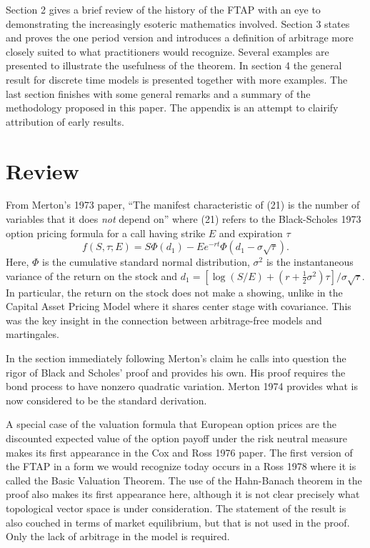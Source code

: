 \documentclass[fleqn]{amsart}
\newcommand{\onehalf}{\frac{1}{2}}
\begin{document}
Section 2 gives a brief review of the history of the FTAP with an
eye to demonstrating the increasingly esoteric mathematics involved.
Section 3 states and proves the one period version and introduces a
definition of arbitrage more closely suited to what practitioners would
recognize. Several examples are presented to illustrate the usefulness
of the theorem. In section 4 the general result for discrete time models
is presented together with more examples.  The last section finishes
with some general remarks and a summary of the methodology proposed
in this paper. The appendix is an attempt to clairify attribution of
early results.

\section{Review}
From Merton's 1973 \cite{Mer1973} paper,
``The manifest characteristic of (21) is the number of variables
that it does {\em not} depend on'' where (21)
refers to the Black-Scholes 1973 \cite{BlaSch1973} option pricing formula
for a call having strike $E$ and expiration $\tau$
\begin{equation*}
f(S, \tau; E) = S\Phi(d_1) - Ee^{-rt}\Phi(d_1 - \sigma\sqrt{\tau}).
\end{equation*}
Here, $\Phi$ is the cumulative standard normal distribution, $\sigma^2$ is the
instantaneous variance of the return on the stock and $d_1 = [\log(S/E)
+ (r + \onehalf\sigma^2)\tau]/\sigma\sqrt{\tau}$.
In particular, the return on the stock does
not make a showing, unlike in the Capital Asset Pricing Model
where it shares center stage with covariance.
This was the key insight in the connection between arbitrage-free
models and martingales.

In the section immediately following Merton's claim he calls into
question the rigor of Black and Scholes' proof and provides his own.
His proof requires the bond process to have nonzero quadratic variation.
Merton 1974 \cite{Mer1974} provides what is now considered to be the
standard derivation.

A special case of the valuation formula that European option prices
are the discounted expected value of the option payoff under the risk
neutral measure makes its first appearance in the Cox and Ross 1976
\cite{CoxRos1976} paper.  The first version of the FTAP in a form we would
recognize today occurs in a Ross 1978 \cite{Ros1978} where it is called
the Basic Valuation Theorem.  The use of the Hahn-Banach theorem in the
proof also makes its first appearance here, although it is not clear
precisely what topological vector space is under consideration.  The
statement of the result is also couched in terms of market equilibrium,
but that is not used in the proof. Only the lack of arbitrage in the
model is required.
\end{document}
